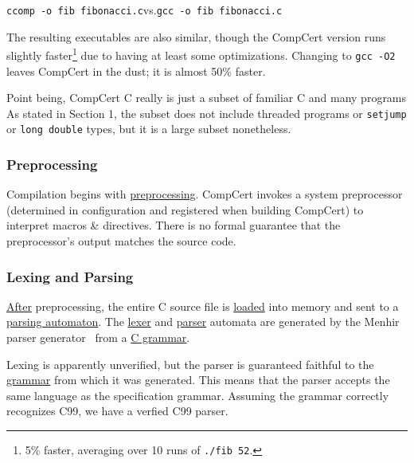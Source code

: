 \vspace{1mm}
\hfill{}\lstinline{ccomp -o fib fibonacci.c}\hfill{}vs.\hfill{}\lstinline{gcc -o fib fibonacci.c}\hfill{}
\vspace{1mm}

The resulting executables are also similar, though the CompCert version runs slightly faster\footnote{5\% faster, averaging over 10 runs of \lstinline{./fib 52}.} due to having at least some optimizations.
Changing to {\tt gcc -O2} leaves CompCert in the dust; it is almost 50\% faster.

Point being, CompCert C really is just a subset of familiar C and many programs
As stated in Section 1, the subset does not include threaded programs or {\tt setjump} or \lstinline{long double} types, but it is a large subset nonetheless.


\subsubsection{Preprocessing}

Compilation begins with \href{https://github.com/AbsInt/CompCert/blob/master/driver/Driver.ml#L272}{preprocessing}.
CompCert invokes a system preprocessor (determined in configuration and registered when building CompCert) to interpret macros \& directives.
There is no formal guarantee that the preprocessor's output matches the source code.


\subsubsection{Lexing and Parsing}

\href{https://github.com/AbsInt/CompCert/blob/master/driver/Driver.ml#L129}{After} preprocessing, the entire C source file is \href{https://github.com/AbsInt/CompCert/blob/master/cparser/Parse.ml#L56}{loaded} into memory and sent to a \href{https://github.com/AbsInt/CompCert/blob/master/cparser/Parser.vy}{parsing automaton}.
The \href{https://github.com/AbsInt/CompCert/blob/master/cparser/Lexer.mll}{lexer} and \href{https://github.com/AbsInt/CompCert/blob/master/cparser/Parser.vy}{parser}
 automata are generated by the Menhir parser generator~\cite{pr-menhir} from a \href{https://github.com/AbsInt/CompCert/blob/master/cparser/pre\_parser.mly}{C grammar}.

Lexing is apparently unverified, but the parser is guaranteed faithful to the \href{https://github.com/AbsInt/CompCert/blob/master/cparser/validator/Main.v#L38}{grammar} from which it was generated.
This means that the parser accepts the same language as the specification grammar.
Assuming the grammar correctly recognizes C99, we have a verfied C99 parser.


